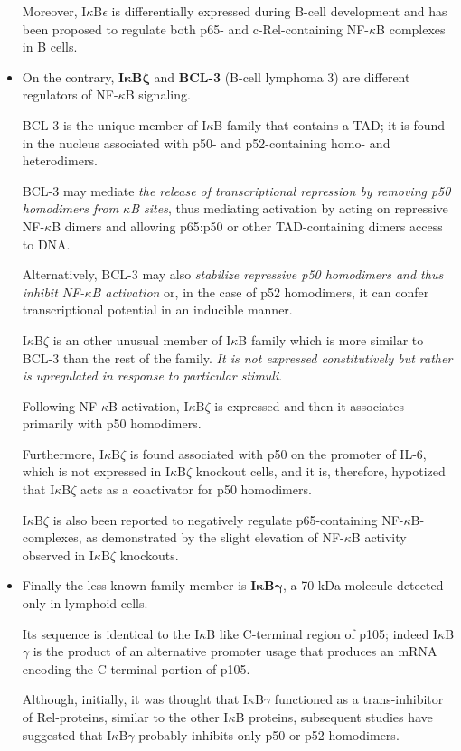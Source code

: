 \documentclass[12pt,a4paper]{report}
\begin{document}
\begin{itemize}
 Moreover, I$\kappa$B$\epsilon$ is differentially expressed during B-cell development and has been proposed to regulate both p65- and c-Rel-containing NF-$\kappa$B complexes in B cells.
 
 \item On the contrary, \textbf{I$\bm{\kappa}$B$\bm{\zeta}$} and \textbf{BCL-3} (B-cell lymphoma 3) are different regulators of NF-$\kappa$B signaling.
 
 BCL-3 is the unique member of I$\kappa$B family that contains a TAD; it is found in the nucleus associated with p50- and p52-containing homo- and heterodimers.
 
 BCL-3 may mediate \emph{the release of transcriptional repression by removing p50 homodimers from $\kappa$B sites}, thus mediating activation by acting on repressive NF-$\kappa$B dimers and allowing p65:p50 or other TAD-containing dimers access to DNA.
 
 Alternatively, BCL-3 may also \emph{stabilize
 repressive p50 homodimers and thus inhibit NF-$\kappa$B activation} or, in the case of p52 homodimers, it can confer transcriptional potential in an inducible manner. 
 
 I$\kappa$B$\zeta$ is an other unusual member of I$\kappa$B family which is more similar to BCL-3 than the rest of the family. \emph{It is not expressed constitutively but rather is upregulated in response to particular stimuli}.
 
 Following NF-$\kappa$B activation, I$\kappa$B$\zeta$ is expressed and then it associates primarily with p50 homodimers.
 
 Furthermore, I$\kappa$B$\zeta$ is found associated with p50 on the promoter of IL-6, which is not expressed in I$\kappa$B$\zeta$ knockout cells, and it is, therefore, hypotized that I$\kappa$B$\zeta$ acts as a coactivator for p50 homodimers. 
 
 I$\kappa$B$\zeta$ is also been reported to negatively regulate p65-containing NF-$\kappa$B- complexes, as demonstrated by the slight elevation of NF-$\kappa$B activity observed in I$\kappa$B$\zeta$ knockouts.
 
 
 \item Finally the less known family member is \textbf{I$\bm{\kappa}$B$\bm{\gamma}$}, a 70 kDa molecule detected only in lymphoid cells.
 
 Its sequence is identical to the I$\kappa$B like C-terminal region of p105; indeed I$\kappa$B$\gamma$ is the product of an alternative promoter usage that produces an mRNA encoding the C-terminal portion of p105.
 
 Although, initially, it was thought that I$\kappa$B$\gamma$ functioned as a trans-inhibitor of Rel-proteins, similar to the other I$\kappa$B proteins, subsequent studies have suggested that I$\kappa$B$\gamma$ probably inhibits only p50 or p52 homodimers.
\end{itemize}
\end{document}
